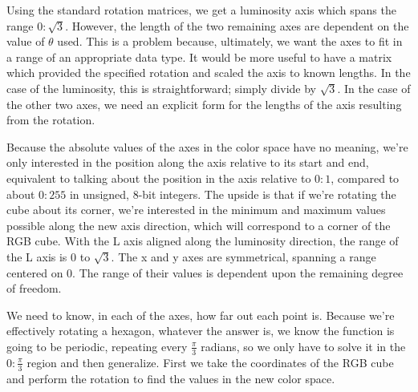 Using the standard rotation matrices, we get a luminosity axis which spans the range $0:\sqrt{3}$. However, the length of the two remaining axes are dependent on the value of $\theta$ used. This is a problem because, ultimately, we want the axes to fit in a range of an appropriate data type. It would be more useful to have a matrix which provided the specified rotation and scaled the axis to known lengths. In the case of the luminosity, this is straightforward; simply divide by $\sqrt{3}$. In the case of the other two axes, we need an explicit form for the lengths of the axis resulting from the rotation.

Because the absolute values of the axes in the color space have no meaning, we're only interested in the position along the axis relative to its start and end, equivalent to talking about the position in the axis relative to $0:1$, compared to about $0:255$ in unsigned, 8-bit integers. The upside is that if we're rotating the cube about its corner, we're interested in the minimum and maximum values possible along the new axis direction, which will correspond to a corner of the RGB cube. With the L axis aligned along the luminosity direction, the range of the L axis is 0 to $\sqrt{3}$. The x and y axes are symmetrical, spanning a range centered on 0. The range of their values is dependent upon the remaining degree of freedom.

We need to know, in each of the axes, how far out each point is. Because we're effectively rotating a hexagon, whatever the answer is, we know the function is going to be periodic, repeating every $\frac{\pi}{3}$ radians, so we only have to solve it in the $0:\frac{\pi}{3}$ region and then generalize. First we take the coordinates of the RGB cube and perform the rotation to find the values in the new color space.


